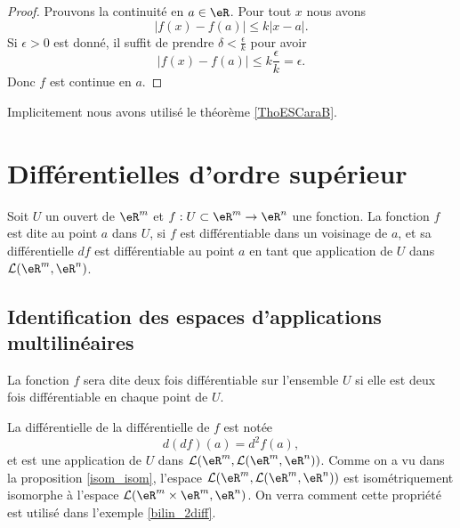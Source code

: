 \begin{proof}
    Prouvons la continuité en \( a\in \eR\). Pour tout \( x\) nous avons
    \begin{equation}
        \big| f(x)-f(a) \big|\leq k| x-a |.
    \end{equation}
    Si \( \epsilon>0\) est donné, il suffit de prendre \( \delta<\frac{ \epsilon }{ k }\) pour avoir
    \begin{equation}
        \big| f(x)-f(a) \big|\leq k\frac{ \epsilon }{ k }=\epsilon.
    \end{equation}
    Donc \( f\) est continue en \( a\).
\end{proof}
Implicitement nous avons utilisé le théorème \ref{ThoESCaraB}.

\section{Différentielles d'ordre supérieur}		\label{SecDiffOrdSup}
\begin{definition}
	Soit $U$ un ouvert de $\eR^m$ et  $f:U\subset\eR^m\to \eR^n$ une fonction. La fonction $f$ est dite  au point $a$ dans $U$,  si $f$ est différentiable dans un voisinage de $a$, et sa différentielle $df$ est différentiable au point $a$ en tant que application de $U$ dans $\mathcal{L}(\eR^m, \eR^n)$.  

\subsection{Identification des espaces d'applications multilinéaires}

La fonction $f$ sera dite deux fois différentiable sur l'ensemble $U$ si elle est deux fois différentiable en chaque point de $U$.
\end{definition}
La différentielle de la différentielle de $f$ est notée 
\[
d(df)(a)=d^2f(a),
\]
et est une application de $U$ dans $\mathcal{L}(\eR^m,\mathcal{L}(\eR^m, \eR^n) )$. Comme on a vu dans la proposition \ref{isom_isom}, l'espace $\mathcal{L}(\eR^m,\mathcal{L}(\eR^m, \eR^n) )$ est isométriquement isomorphe à l'espace $\mathcal{L}(\eR^m\times\eR^m, \eR^n )$. On verra comment cette propriété  est utilisé dans l'exemple \ref{bilin_2diff}.


